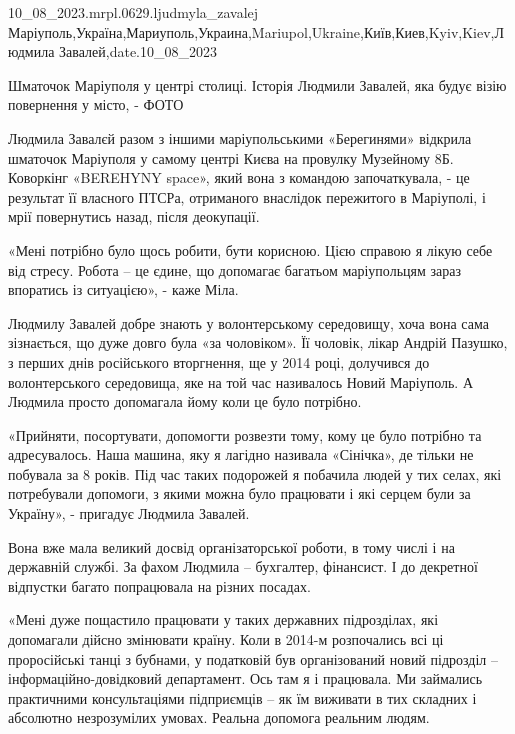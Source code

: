  
 
 
 
 

10_08_2023.mrpl.0629.ljudmyla_zavalej
Маріуполь,Україна,Мариуполь,Украина,Mariupol,Ukraine,Київ,Киев,Kyiv,Kiev,Людмила Завалей,date.10_08_2023

Шматочок Маріуполя у центрі столиці. Історія Людмили Завалей, яка будує візію повернення у місто, - ФОТО

Людмила Завалєй разом з іншими маріупольськими «Берегинями» відкрила шматочок
Маріуполя у самому центрі Києва на провулку Музейному 8Б. Коворкінг «BEREHYNY
space», який вона з командою започаткувала,  - це результат її власного ПТСРа,
отриманого внаслідок пережитого в Маріуполі, і мрії повернутись назад, після
деокупації. 

«Мені потрібно було щось робити, бути корисною. Цією справою я лікую себе від
стресу. Робота – це єдине, що допомагає багатьом маріупольцям зараз впоратись
із ситуацією», - каже Міла.

Людмилу Завалей добре знають у волонтерському середовищу, хоча вона сама
зізнається, що дуже довго була «за чоловіком». Її чоловік, лікар Андрій
Пазушко, з перших днів російського вторгнення, ще у 2014 році, долучився  до
волонтерського середовища, яке на той час називалось Новий Маріуполь. А Людмила
просто допомагала йому коли це було потрібно. 

«Прийняти, посортувати,  допомогти розвезти тому, кому це було потрібно та
адресувалось. Наша машина, яку я лагідно називала  «Сінічка», де тільки не
побувала за 8 років. Під час таких подорожей я побачила людей у тих селах, які
потребували допомоги, з якими можна було працювати і які серцем були за
Україну», - пригадує Людмила Завалей.

Вона вже мала великий досвід організаторської роботи, в тому числі і на
державній службі. За фахом Людмила – бухгалтер, фінансист. І до декретної
відпустки багато попрацювала на різних посадах.

«Мені дуже пощастило працювати у таких державних підрозділах, які допомагали
дійсно змінювати країну. Коли в 2014-м розпочались всі ці проросійські танці з
бубнами, у податковій був організований новий підрозділ –
інформаційно-довідковий департамент. Ось там я і працювала. Ми займались
практичними консультаціями підприємців – як їм виживати в тих складних і
абсолютно незрозумілих умовах. Реальна допомога реальним людям.

